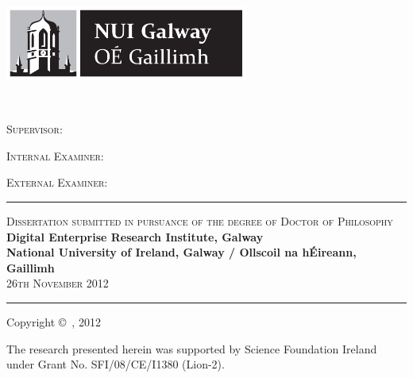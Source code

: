 \begin{titlepage}
\pagestyle{empty}
\vspace*{\fill}

\begin{center}

\includegraphics[width=0.6\textwidth]{nuig-new}

\vspace{2.5cm}

{\LARGE
\textbf{\myTitle} \\
\par}

\vspace{2.5cm}

\textbf{\Large \myName}
\vspace{1.7cm}

{\large \textsc{Supervisor:} \textbf{\mySupervisor}}\\
\vspace{0.3cm}

{\large \textsc{Internal Examiner:} \textbf{\myInternalExaminer}}\\
\vspace{0.3cm}

{\large \textsc{External Examiner:} \textbf{\myExternalExaminer}}\\
\vspace{0.3cm}

\vspace{3cm} 
\hrule
\vspace{0.5cm}
\textsc{Dissertation submitted in pursuance of the degree of Doctor of Philosophy}\\
\vspace{0.5cm}
{\large 
\textbf{Digital Enterprise Research Institute, Galway}\\
\textbf{National University of Ireland, Galway / Ollscoil na h\'Eireann, Gaillimh}\\
}
\vspace{0.5cm}
\textsc{26th November 2012}\\
\end{center}

\vspace*{\fill}
\end{titlepage}



\newpage
\pagestyle{empty}

\vspace*{\fill}
\hrule
\begin{center}
Copyright \copyright~\myName, 2012
\end{center}
\vspace*{0.4cm}
{\small The research presented herein was supported by Science Foundation Ireland under Grant No. SFI/08/CE/I1380 (Lion-2).}\\
\newpage


